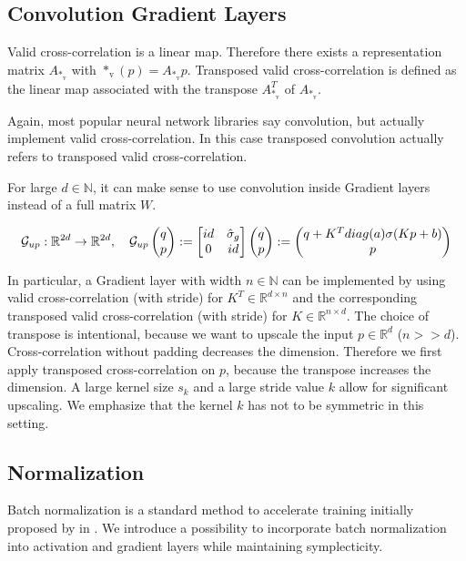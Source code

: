 \documentclass[twoside,a4paper]{article}
\begin{document}
\subsection{Convolution Gradient Layers}

Valid cross-correlation is a linear map. Therefore
there exists a representation matrix $A_{*_{\text{v}}}$ with $*_{\text{v}}(p) = A_{*_{\text{v}}}p$.
Transposed valid cross-correlation 
is defined as the linear map associated with the transpose $A_{*_{\text{v}}}^T$ of $A_{*_{\text{v}}}$.

Again, most popular neural network libraries say convolution, but actually implement
valid cross-correlation. In this case transposed convolution actually refers to
transposed valid cross-correlation.

For large $d \in \mathbb{N}$, it can make sense to use convolution inside Gradient layers 
instead of a full matrix $W$.

\begin{equation*}
	\mathcal{G}_{up} : \mathbb{R}^{2d} \to \mathbb{R}^{2d}, \quad
	\mathcal{G}_{up} \begin{pmatrix} q \\ p \end{pmatrix} := \begin{bmatrix} id & {\hat{\sigma}_g} \\ 0 & id \end{bmatrix} \begin{pmatrix} q \\ p \end{pmatrix} := \begin{pmatrix}
		q + K^T diag(a) \sigma(Kp + b) \\
		p
	\end{pmatrix}
\end{equation*}

In particular, a Gradient layer with width $n \in \mathbb{N}$ can be implemented by 
using valid cross-correlation (with stride) for $K^T \in \mathbb{R}^{d \times n}$ and the
corresponding transposed valid cross-correlation (with stride) for $K \in \mathbb{R}^{n \times d}$.
The choice of transpose is intentional, because we want to upscale the input $p \in \mathbb{R}^d$ ($n >> d$). 
Cross-correlation without padding decreases the dimension. Therefore we first apply 
transposed cross-correlation on $p$, because the transpose increases the dimension.
A large kernel size $s_k$ and a large stride value $k$ allow for significant upscaling.
We emphasize that the kernel $k$ has not to be symmetric in this setting.

\subsection{Normalization}

Batch normalization is a standard method to accelerate training initially proposed by
\citeauthor{batchnorm-ioffe15} in \cite{batchnorm-ioffe15}. 
We introduce a possibility to incorporate batch normalization
into activation and gradient layers while maintaining symplecticity.
\end{document}
